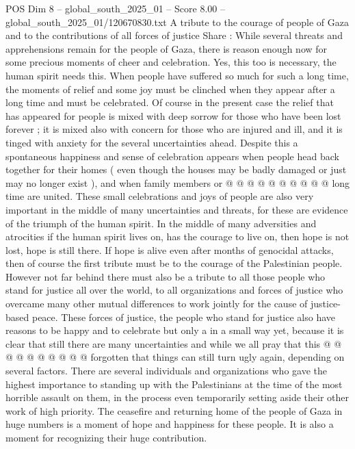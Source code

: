 \begin{textsample}{POS Dim 8 – global\_south\_2025\_01 – Score 8.00 – global\_south\_2025\_01/120670830.txt}  \label{ex:f8_pos_114}
A tribute to the courage of people of Gaza and to the contributions of all forces of justice Share : While several threats and apprehensions remain for the people of Gaza, there is reason enough now for some precious moments of cheer and celebration.
Yes, this too is necessary, the human spirit needs this.
When people have suffered so much for such a long time, the moments of relief and some joy must be clinched when they appear after a long time and must be celebrated.
Of course in the present case the relief that has appeared for people is mixed with deep sorrow for those who have been lost forever ; it is mixed also with concern for those who are injured and ill, and it is tinged with anxiety for the several uncertainties ahead.
Despite this a spontaneous happiness and sense of celebration appears when people head back together for their homes ( even though the houses may be badly damaged or just may no longer exist ), and when family members or @ @ @ @ @ @ @ @ @ @ long time are united.
These small celebrations and joys of people are also very important in the middle of many uncertainties and threats, for these are evidence of the triumph of the human spirit.
In the middle of many adversities and atrocities if the human spirit lives on, has the courage to live on, then hope is not lost, hope is still there.
If hope is alive even after months of genocidal attacks, then of course the first tribute must be to the courage of the Palestinian people.
However not far behind there must also be a tribute to all those people who stand for justice all over the world, to all organizations and forces of justice who overcame many other mutual differences to work jointly for the cause of justice-based peace.
These forces of justice, the people who stand for justice also have reasons to be happy and to celebrate but only a in a small way yet, because it is clear that still there are many uncertainties and while we all pray that this @ @ @ @ @ @ @ @ @ @ forgotten that things can still turn ugly again, depending on several factors.
There are several individuals and organizations who gave the highest importance to standing up with the Palestinians at the time of the most horrible assault on them, in the process even temporarily setting aside their other work of high priority.
The ceasefire and returning home of the people of Gaza in huge numbers is a moment of hope and happiness for these people.
It is also a moment for recognizing their huge contribution.

\end{textsample}
